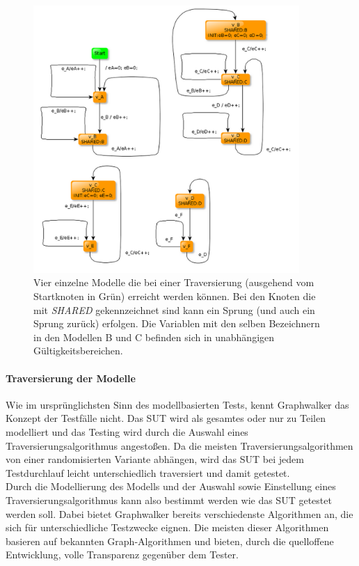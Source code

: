 \begin{figure}[h] 
  \centering
     \includegraphics[width=0.9\textwidth]{figures/gw_multiple_models.png}
  \caption{Vier einzelne Modelle die bei einer Traversierung (ausgehend vom Startknoten in Grün) erreicht werden können. Bei den Knoten die mit \textit{SHARED} gekennzeichnet sind kann ein Sprung (und auch ein Sprung zurück) erfolgen. Die Variablen mit den selben Bezeichnern in den Modellen B und C befinden sich in unabhängigen Gültigkeitsbereichen.\cite{_graphwalker_2015}}
  \label{fig:gw_multiple_models}
\end{figure}

\paragraph{Traversierung der Modelle} 
\label{sec:graphwalker_traversierung} 
Wie im ursprünglichsten Sinn des modellbasierten Tests, kennt Graphwalker das Konzept der Testfälle nicht. Das SUT wird als gesamtes oder nur zu Teilen modelliert und das Testing wird durch die Auswahl eines Traversierungsalgorithmus angestoßen. Da die meisten Traversierungsalgorithmen von einer randomisierten Variante abhängen, wird das SUT bei jedem Testdurchlauf leicht unterschiedlich traversiert und damit getestet.\\
Durch die Modellierung des Modells und der Auswahl sowie Einstellung eines Traversierungsalgorithmus kann also bestimmt werden wie das SUT getestet werden soll. Dabei bietet Graphwalker bereits verschiedenste Algorithmen an, die sich für unterschiedliche Testzwecke eignen. Die meisten dieser Algorithmen basieren auf bekannten Graph-Algorithmen und bieten, durch die quelloffene Entwicklung, volle Transparenz gegenüber dem Tester.

